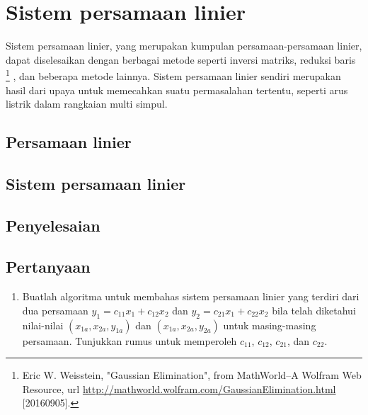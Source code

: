 \setcounter{chapter}{18}
\setcounter{page}{321}


\chapter{Sistem persamaan linier}
Sistem persamaan linier, yang merupakan kumpulan persamaan-persamaan linier, dapat diselesaikan dengan berbagai metode seperti inversi matriks, reduksi baris \footnote{Eric W. Weisstein, "Gaussian Elimination", from MathWorld--A Wolfram Web Resource, url \url{http://mathworld.wolfram.com/GaussianElimination.html} [20160905].}
, dan beberapa metode lainnya. Sistem persamaan linier sendiri merupakan hasil dari upaya untuk memecahkan suatu permasalahan tertentu, seperti arus listrik dalam
rangkaian multi simpul.


%
\section{Persamaan linier}


%
\section{Sistem persamaan linier}


%
\section{Penyelesaian}


%
\section{Pertanyaan}
\begin{enumerate}
\item Buatlah algoritma untuk membahas sistem persamaan linier yang terdiri dari dua persamaan $y_1 = c_{11} x_1 + c_{12} x_2$ dan $y_2 = c_{21} x_1 + c_{22} x_2$ bila telah diketahui nilai-nilai $(x_{1a}, x_{2a}, y_{1a})$ dan $(x_{1a}, x_{2a}, y_{2a})$ untuk masing-masing persamaan. Tunjukkan rumus untuk memperoleh $c_{11}$, $c_{12}$, $c_{21}$, dan $c_{22}$.
\end{enumerate}
